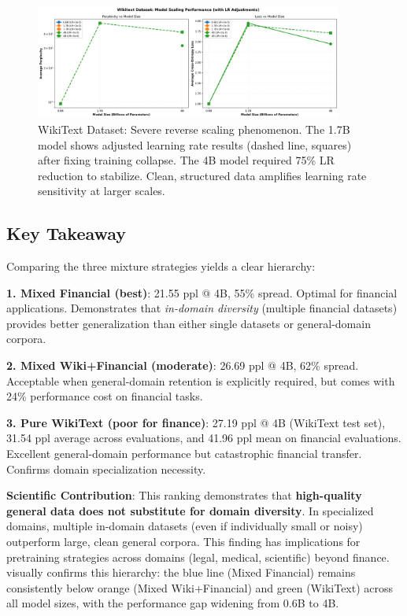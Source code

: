 \begin{figure}[h]
\centering
\includegraphics[width=0.9\textwidth]{figures/scaling_wikitext.png}
\caption[WikiText Dataset: Reverse Scaling]{WikiText Dataset: Severe reverse scaling phenomenon. The 1.7B model shows adjusted learning rate results (dashed line, squares) after fixing training collapse. The 4B model required 75\% LR reduction to stabilize. Clean, structured data amplifies learning rate sensitivity at larger scales.}
\label{fig:scaling_wikitext}
\end{figure}



\subsection{Key Takeaway}

Comparing the three mixture strategies yields a clear hierarchy:

\textbf{1. Mixed Financial (best)}: 21.55 ppl @ 4B, 55\% spread. Optimal for financial applications. Demonstrates that \textit{in-domain diversity} (multiple financial datasets) provides better generalization than either single datasets or general-domain corpora.

\textbf{2. Mixed Wiki+Financial (moderate)}: 26.69 ppl @ 4B, 62\% spread. Acceptable when general-domain retention is explicitly required, but comes with 24\% performance cost on financial tasks.

\textbf{3. Pure WikiText (poor for finance)}: 27.19 ppl @ 4B (WikiText test set), 31.54 ppl average across evaluations, and 41.96 ppl mean on financial evaluations. Excellent general-domain performance but catastrophic financial transfer. Confirms domain specialization necessity.

\textbf{Scientific Contribution}: This ranking demonstrates that \textbf{high-quality general data does not substitute for domain diversity}. In specialized domains, multiple in-domain datasets (even if individually small or noisy) outperform large, clean general corpora. This finding has implications for pretraining strategies across domains (legal, medical, scientific) beyond finance.  visually confirms this hierarchy: the blue line (Mixed Financial) remains consistently below orange (Mixed Wiki+Financial) and green (WikiText) across all model sizes, with the performance gap widening from 0.6B to 4B.

